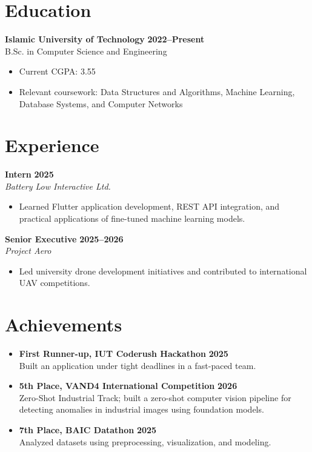 \documentclass{resume}
\renewenvironment{rSection}[1]{
  \section{#1}
  \begin{list}{}{
      \setlength{\leftmargin}{0.2em}
  }
  \item[]
}{
  \end{list}
  \vspace{0pt}
}
\begin{document}
\fontsize{11.5pt}{14pt}\selectfont


\begin{rSection}{Education}
\textbf{Islamic University of Technology} \hfill \textbf{2022--Present} \\
B.Sc. in Computer Science and Engineering
\begin{itemize}
  \item Current CGPA: 3.55
  \item Relevant coursework: Data Structures and Algorithms, Machine Learning, Database Systems, and Computer Networks
\end{itemize}
\end{rSection}

\begin{rSection}{Experience}
\textbf{Intern} \hfill \textbf{2025} \\
\emph{Battery Low Interactive Ltd.}
\begin{itemize}
  \item Learned Flutter application development, REST API integration, and practical applications of fine-tuned machine learning models.
\end{itemize}

\textbf{Senior Executive} \hfill \textbf{2025--2026} \\
\emph{Project Aero}
\begin{itemize}
  \item Led university drone development initiatives and contributed to international UAV competitions.
\end{itemize}
\end{rSection}

\begin{rSection}{Achievements}
\begin{itemize}[leftmargin=*,label=$\bullet$]
  \item \textbf{First Runner-up, IUT Coderush Hackathon} \hfill \textbf{2025} \\
  Built an application under tight deadlines in a fast-paced team.
  \item \textbf{5th Place, VAND4 International Competition} \hfill \textbf{2026} \\
  Zero-Shot Industrial Track; built a zero-shot computer vision pipeline for detecting anomalies in industrial images using foundation models.
  \item \textbf{7th Place, BAIC Datathon} \hfill \textbf{2025} \\
  Analyzed datasets using preprocessing, visualization, and modeling.
\end{itemize}
\end{rSection}
\end{document}
